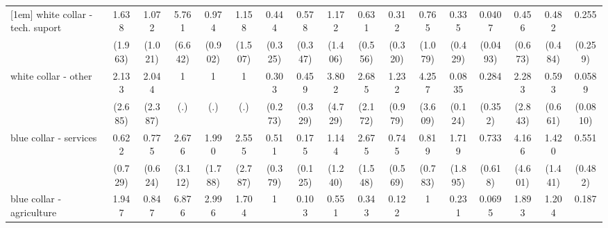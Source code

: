 {\begin{tabular}{l*{16}{c}}
[1em]
white collar - tech. suport&       1.638         &       1.072         &       5.761         &       0.974         &       1.158         &       0.444         &       0.578         &       1.172         &       0.631         &       0.312         &       0.765         &       0.335         &      0.0407\sym{**} &       0.456         &       0.482         &       0.255         \\
                    &     (1.963)         &     (1.021)         &     (6.642)         &     (0.902)         &     (1.507)         &     (0.325)         &     (0.347)         &     (1.406)         &     (0.556)         &     (0.320)         &     (1.079)         &     (0.429)         &    (0.0493)         &     (0.673)         &     (0.484)         &     (0.259)         \\
[1em]
white collar - other&       2.133         &       2.044         &           1         &           1         &           1         &       0.303         &       0.459         &       3.802         &       2.685         &       1.232         &       4.257         &      0.0835         &       0.284         &       2.283         &       0.593         &      0.0589\sym{*}  \\
                    &     (2.685)         &     (2.387)         &         (.)         &         (.)         &         (.)         &     (0.273)         &     (0.329)         &     (4.729)         &     (2.172)         &     (0.979)         &     (3.609)         &     (0.124)         &     (0.352)         &     (2.843)         &     (0.661)         &    (0.0810)         \\
[1em]
blue collar - services&       0.622         &       0.775         &       2.676         &       1.990         &       2.555         &       0.511         &       0.175\sym{*}  &       1.144         &       2.675         &       0.745         &       0.819         &       1.719         &       0.733         &       4.166         &       1.420         &       0.551         \\
                    &     (0.729)         &     (0.624)         &     (3.112)         &     (1.788)         &     (2.787)         &     (0.379)         &     (0.125)         &     (1.240)         &     (1.548)         &     (0.569)         &     (0.783)         &     (1.895)         &     (0.618)         &     (4.601)         &     (1.441)         &     (0.482)         \\
[1em]
blue collar - agriculture&       1.947         &       0.847         &       6.876         &       2.996         &       1.704         &           1         &       0.103\sym{*}  &       0.551         &       0.343         &       0.122         &           1         &       0.231         &      0.0695\sym{*}  &       1.893         &       1.204         &       0.187         \\

\end{tabular}}
